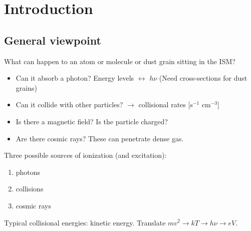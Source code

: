 \documentclass[12pt]{article}
\newcommand{\mar}[1]{\hspace{0pt}\marginpar{-\textcolor{black}{#1}-}}
\begin{document}
\setlength{\parskip}{0ex}
\tableofcontents\newpage
\setlength{\parskip}{2ex}

\reversemarginpar
\section{Introduction}
\subsection{General viewpoint}
\mar{6}What can happen to an atom or molecule or dust
grain sitting in the ISM?
\begin{itemize}
    \item Can it absorb a photon? Energy levels $\leftrightarrow$ $h\nu$
        (Need cross-sections for dust grains)
    \item Can it collide with other particles? $\rightarrow$ collisional
        rates [s$^{-1}$ cm$^{-3}$]
    \item Is there a magnetic field? Is the particle charged?
    \item Are there cosmic rays? These can penetrate dense gas.
\end{itemize}
Three possible sources of ionization (and excitation):
\begin{enumerate}
    \item photons
    \item collisions
    \item cosmic rays
\end{enumerate}
Typical collisional energies: kinetic energy.
Translate $mv^{2} \rightarrow kT \rightarrow h\nu \rightarrow eV$.
\end{document}
